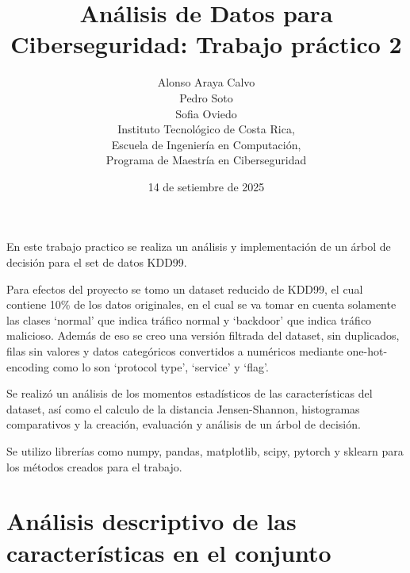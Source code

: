 \documentclass[12pt,a4paper]{article}
\begin{document}
\title{Análisis de Datos para Ciberseguridad: Trabajo práctico 2}

\author{
  Alonso Araya Calvo \\
  Pedro Soto \\
  Sofia Oviedo \\
  Instituto Tecnológico de Costa Rica, \\
  Escuela de Ingeniería en Computación, \\
  Programa de Maestría en Ciberseguridad
}

\date{ 14 de setiembre de 2025 }
\maketitle

En este trabajo practico se realiza un análisis y implementación de un árbol de decisión para el set de datos KDD99.

Para efectos del proyecto se tomo un dataset reducido de KDD99, el cual contiene 10\% de los datos originales,
en el cual se va tomar en cuenta solamente las clases `normal' que indica tráfico normal y `backdoor' que indica tráfico malicioso.
Además de eso se creo una versión filtrada del dataset, sin duplicados, filas sin valores y datos categóricos convertidos a
numéricos mediante one-hot-encoding como lo son `protocol type', `service' y `flag'.

Se realizó un análisis de los momentos estadísticos de las características del dataset, así como el calculo de la distancia Jensen-Shannon,
histogramas comparativos y la creación, evaluación y análisis de un árbol de decisión.

Se utilizo librerías como numpy, pandas, matplotlib, scipy, pytorch y sklearn para los métodos creados para el trabajo.

\section{Análisis descriptivo de las características en el conjunto}
\end{document}
